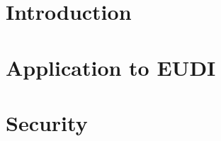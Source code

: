 \documentclass{iacrtrans}
\newcommand{\jbel}[1]{{\color{blue}{}jbel: #1}}
\begin{document}


\section{Introduction}
\label{sec:introduction}


\section{Application to EUDI}
\label{sec:appeudi}




\section{Security}
\label{sec:security}
\end{document}
